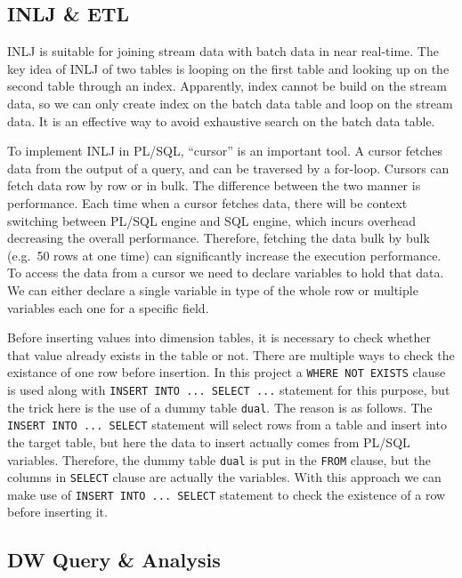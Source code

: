 \documentclass[
  a4paper,
]{article}
\begin{document}
\hypertarget{inlj-etl}{%
\subsection{INLJ \& ETL}\label{inlj-etl}}

INLJ is suitable for joining stream data with batch data in near
real-time. The key idea of INLJ of two tables is looping on the first
table and looking up on the second table through an index. Apparently,
index cannot be build on the stream data, so we can only create index on
the batch data table and loop on the stream data. It is an effective way
to avoid exhaustive search on the batch data table.

To implement INLJ in PL/SQL, ``cursor'' is an important tool. A cursor
fetches data from the output of a query, and can be traversed by a
for-loop. Cursors can fetch data row by row or in bulk. The difference
between the two manner is performance. Each time when a cursor fetches
data, there will be context switching between PL/SQL engine and SQL
engine, which incurs overhead decreasing the overall performance.
Therefore, fetching the data bulk by bulk (e.g.~50 rows at one time) can
significantly increase the execution performance. To access the data
from a cursor we need to declare variables to hold that data. We can
either declare a single variable in type of the whole row or multiple
variables each one for a specific field.

Before inserting values into dimension tables, it is necessary to check
whether that value already exists in the table or not. There are
multiple ways to check the existance of one row before insertion. In
this project a \texttt{WHERE\ NOT\ EXISTS} clause is used along with
\texttt{INSERT\ INTO\ ...\ SELECT\ ...} statement for this purpose, but
the trick here is the use of a dummy table \texttt{dual}. The reason is
as follows. The \texttt{INSERT\ INTO\ ...\ SELECT} statement will select
rows from a table and insert into the target table, but here the data to
insert actually comes from PL/SQL variables. Therefore, the dummy table
\texttt{dual} is put in the \texttt{FROM} clause, but the columns in
\texttt{SELECT} clause are actually the variables. With this approach we
can make use of \texttt{INSERT\ INTO\ ...\ SELECT} statement to check
the existence of a row before inserting it.

\hypertarget{dw-query-analysis}{%
\subsection{DW Query \& Analysis}\label{dw-query-analysis}}
\end{document}

